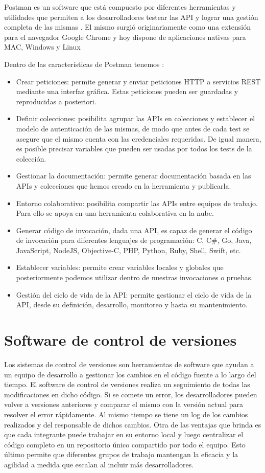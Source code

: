 Postman es un software que está compuesto por diferentes herramientas y utilidades que permiten a los desarrolladores testear las API y lograr una gestión completa de las mismas \citep{WEBSITE:postman1}. El mismo surgió originariamente como una extensión para el navegador Google Chrome y hoy dispone de aplicaciones nativas para MAC, Windows y Linux

Dentro de las características de Postman tenemos \citep{WEBSITE:postman2}: 
\begin{itemize}
\item Crear peticiones: permite generar y enviar peticiones HTTP a servicios REST mediante una interfaz gráfica. Estas peticiones pueden ser guardadas y reproducidas a posteriori.
\item Definir colecciones: posibilita agrupar las APIs en colecciones y establecer el modelo de autenticación de las mismas, de modo que antes de cada test se asegure que el mismo cuenta con las credenciales requeridas. De igual manera, es posible precisar variables que pueden ser usadas por todos los tests de la colección.
\item Gestionar la documentación: permite generar documentación basada en las APIs y colecciones que hemos creado en la herramienta y publicarla.
\item Entorno colaborativo: posibilita compartir las APIs entre equipos de trabajo. Para ello se apoya en una herramienta colaborativa en la nube.
\item Generar código de invocación, dada una API, es capaz de generar el código de invocación para diferentes lenguajes de programación: C, C\#, Go, Java, JavaScript, NodeJS, Objective-C, PHP, Python, Ruby, Shell, Swift, etc.
\item Establecer variables: permite crear variables locales y globales que posteriormente podemos utilizar dentro de nuestras invocaciones o pruebas.
\item Gestión del ciclo de vida de la API: permite gestionar el ciclo de vida de la API, desde su definición, desarrollo, monitoreo y hasta su mantenimiento.
\end{itemize}

\section{Software de control de versiones}

Los sistemas de control de versiones son herramientas de software que ayudan a un equipo de desarrollo a gestionar los cambios en el código fuente a lo largo del tiempo. El software de control de versiones realiza un seguimiento de todas las modificaciones en dicho código. Si se comete un error, los desarrolladores pueden volver a versiones anteriores y comparar el mismo con la versión actual para resolver el error rápidamente. Al mismo tiempo se tiene un log de los cambios realizados y del responsable de dichos cambios. Otra de las ventajas que brinda es que cada integrante puede trabajar en su entorno local y luego centralizar el código completo en un repositorio único compartido por todo el equipo. Esto último permite que diferentes grupos de trabajo mantengan la eficacia y la agilidad a medida que escalan al incluir más desarrolladores.

